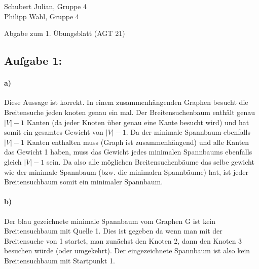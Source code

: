\documentclass[a4paper]{article}
\begin{document}
\begin{small}
	\noindent
	Schubert Julian, Gruppe 4 \\
	Philipp Wahl, Gruppe 4
\end{small}
\bigskip

\begin{center}
	\LARGE Abgabe zum 1. Übungsblatt (AGT 21)
\end{center}
\smallskip

\subsection*{Aufgabe 1:}

\paragraph{a)}
Diese Aussage ist korrekt. In einem zusammenhängenden Graphen besucht die Breitensuche
jeden knoten genau ein mal. Der Breitensuchenbaum enthält genau $|V| - 1$ Kanten (da
jeder Knoten über genau eine Kante besucht wird) und hat somit ein gesamtes Gewicht von
$|V| - 1$. Da der minimale Spannbaum ebenfalls $|V| - 1$ Kanten enthalten muss (Graph ist
zusammenhängend) und alle Kanten das Gewicht 1 haben, muss das Gewicht jedes minimalen 
Spannbaums ebenfalls gleich $|V| - 1$ sein. Da also alle möglichen Breitensuchenbäume
das selbe gewicht wie der minimale Spannbaum (bzw. die minimalen Spannbäume) hat, ist 
jeder Breitensuchbaum somit ein minimaler Spannbaum.
\paragraph{b)}
Der blau gezeichnete minimale Spannbaum vom Graphen G ist kein Breitensuchbaum mit Quelle 1.
Dies ist gegeben da wenn man mit der Breitensuche von 1 startet, man zunächst den Knoten 2, 
dann den Knoten 3 besuchen würde (oder umgekehrt). Der eingezeichnete Spannbaum ist also 
kein Breitensuchbaum mit Startpunkt 1.
\end{document}
